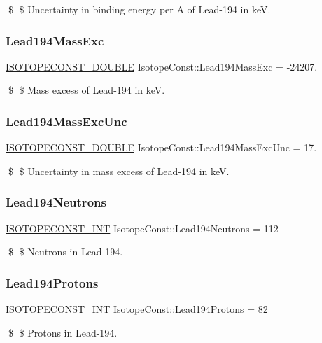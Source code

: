 \$ \$ Uncertainty in binding energy per A of Lead-\/194 in keV. \mbox{\label{group___isotope_const-_lead-_pb194_ga8a79d18c6639a99259895220f7e502f4}} 
\subsubsection{\texorpdfstring{Lead194\+Mass\+Exc}{Lead194MassExc}}
{\footnotesize\ttfamily \mbox{\hyperlink{group___isotope_const-_macros_ga8f45a7272ce02c0b4c65c44636ed719a}{I\+S\+O\+T\+O\+P\+E\+C\+O\+N\+S\+T\+\_\+\+D\+O\+U\+B\+LE}} Isotope\+Const\+::\+Lead194\+Mass\+Exc = -\/24207.}

\$ \$ Mass excess of Lead-\/194 in keV. \mbox{\label{group___isotope_const-_lead-_pb194_ga42d184421df9e486c3bcaac4958a89f1}} 
\subsubsection{\texorpdfstring{Lead194\+Mass\+Exc\+Unc}{Lead194MassExcUnc}}
{\footnotesize\ttfamily \mbox{\hyperlink{group___isotope_const-_macros_ga8f45a7272ce02c0b4c65c44636ed719a}{I\+S\+O\+T\+O\+P\+E\+C\+O\+N\+S\+T\+\_\+\+D\+O\+U\+B\+LE}} Isotope\+Const\+::\+Lead194\+Mass\+Exc\+Unc = 17.}

\$ \$ Uncertainty in mass excess of Lead-\/194 in keV. \mbox{\label{group___isotope_const-_lead-_pb194_ga1f6706ac77e3d8990d8300ca85de3000}} 
\subsubsection{\texorpdfstring{Lead194\+Neutrons}{Lead194Neutrons}}
{\footnotesize\ttfamily \mbox{\hyperlink{group___isotope_const-_macros_ga5f18360b3e99483a35c32d789e62621c}{I\+S\+O\+T\+O\+P\+E\+C\+O\+N\+S\+T\+\_\+\+I\+NT}} Isotope\+Const\+::\+Lead194\+Neutrons = 112}

\$ \$ Neutrons in Lead-\/194. \mbox{\label{group___isotope_const-_lead-_pb194_gae556843e1595705a9c5ade2f210dc094}} 
\subsubsection{\texorpdfstring{Lead194\+Protons}{Lead194Protons}}
{\footnotesize\ttfamily \mbox{\hyperlink{group___isotope_const-_macros_ga5f18360b3e99483a35c32d789e62621c}{I\+S\+O\+T\+O\+P\+E\+C\+O\+N\+S\+T\+\_\+\+I\+NT}} Isotope\+Const\+::\+Lead194\+Protons = 82}

\$ \$ Protons in Lead-\/194. 